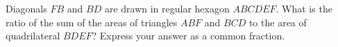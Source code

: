 Diagonals $FB$ and $BD$ are drawn in regular hexagon $ABCDEF$. What is the ratio of the sum of the areas of triangles $ABF$ and $BCD$ to the area of quadrilateral $BDEF$? Express your answer as a common fraction.
